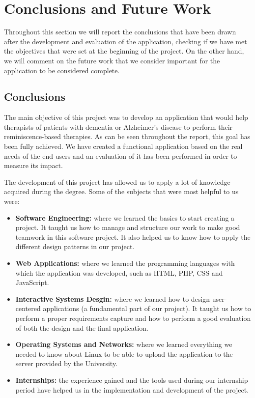 
\chapter{Conclusions and Future Work}
\label{cap:conclusions}

Throughout this section we will report the conclusions that have been drawn after the development and evaluation of the application, checking if we have met the objectives that were set at the beginning of the project. On the other hand, we will comment on the future work that we consider important for the application to be considered complete.

\section{Conclusions}

The main objective of this project was to develop an application that would help therapists of patients with dementia or Alzheimer's disease to perform their reminiscence-based therapies. As can be seen throughout the report, this goal has been fully achieved. We have created a functional application based on the real needs of the end users and an evaluation of it has been performed in order to measure its impact. 

The development of this project has allowed us to apply a lot of knowledge acquired during the degree. Some of the subjects that were most helpful to us were: 

\begin{itemize}
	\item \textbf{Software Engineering:} where we learned the basics to start creating a project. It taught us how to manage and structure our work to make good teamwork in this software project. It also helped us to know how to apply the different design patterns in our project. 
	\item \textbf{Web Applications:} where we learned the programming languages with which the application was developed, such as HTML, PHP, CSS and JavaScript.
	\item \textbf{Interactive Systems Desgin:} where we learned how to design user-centered applications (a fundamental part of our project). It taught us how to perform a  proper requirements capture and how to perform a good evaluation of both the design and the final application.
	\item \textbf{Operating Systems and Networks:} where we learned everything we needed to know about Linux to be able to upload the application to the server provided by the University.
	\item \textbf{Internships:} the experience gained and the tools used during our internship period have helped us in the implementation and development of the project.
\end{itemize}

